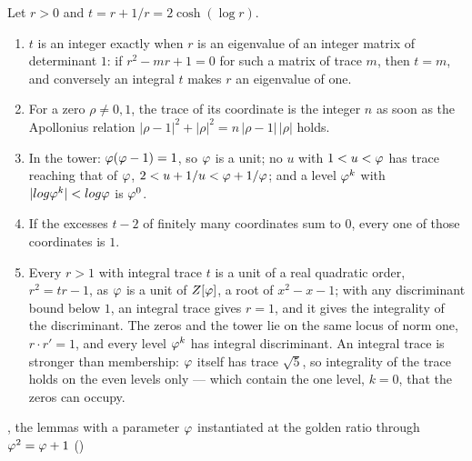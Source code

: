 \begin{proposition}\label{prop:phi-side}
Let $r>0$ and $t=r+1/r=2\cosh(\log r)$.
\begin{enumerate}[label=\textup{(\roman*)}]
  \item $t$ is an integer exactly when $r$ is an eigenvalue of an integer matrix of
    determinant $1$: if $r^2-mr+1=0$ for such a matrix of trace $m$, then $t=m$, and
    conversely an integral $t$ makes $r$ an eigenvalue of one.
  \item For a zero $\rho\ne0,1$, the trace of its coordinate is the integer $n$ as soon as
    the Apollonius relation $|\rho-1|^2+|\rho|^2=n\,|\rho-1|\,|\rho|$ holds.
  \item In the tower: $\varphi(\varphi-1)=1$, so $\varphi$ is a unit; no $u$ with $1<u<\varphi$ has
    trace reaching that of $\varphi$, $2<u+1/u<\varphi+1/\varphi$; and a level $\varphi^k$ with
    $|log\varphi^k|<log\varphi$ is $\varphi^0$.
  \item If the excesses $t-2$ of finitely many coordinates sum to $0$, every one of those coordinates is $1$.
  \item Every $r>1$ with integral trace $t$ is a unit of a real quadratic order,
    $r^2=tr-1$, as $\varphi$ is a unit of $Z[\varphi]$, a root of $x^2-x-1$; with any discriminant bound below $1$, an
    integral trace gives $r=1$, and it gives the integrality of the discriminant.  The
    zeros and the tower lie on the same locus of norm one, $r\cdot r'=1$, and every level
    $\varphi^k$ has integral discriminant.  An integral trace is stronger than membership:
    $\varphi$ itself has trace $\sqrt5$, so integrality of the trace holds on the even
    levels only --- which contain the one level, $k=0$, that the zeros can occupy.
\end{enumerate}
\leavevmode{}, the lemmas with a parameter $\varphi$ instantiated
at the golden ratio through $\varphi^2=\varphi+1$ ()
\end{proposition}

